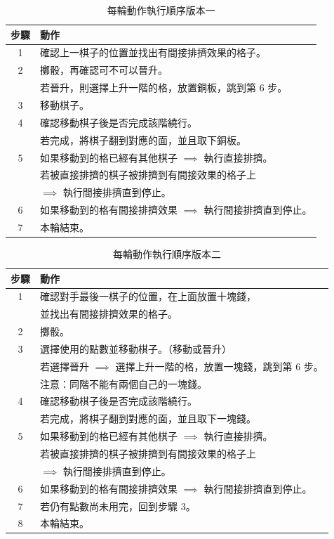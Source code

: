 \documentclass[11pt,a4paper]{article}
\begin{document}
\begin{table} 
	\caption{每輪動作執行順序版本一}
	\label{order_one}
	\centering
	\vspace{0.1cm}
	\begin{tabular}{cl}
		\toprule
			步驟 & 動作\\
		\hline
			1 & 確認上一棋子的位置並找出有間接排擠效果的格子。\\
			2 & 擲骰，再確認可不可以晉升。\\
			  & 若晉升，則選擇上升一階的格，放置銅板，跳到第 6 步。\\
			3 & 移動棋子。\\
			4 & 確認移動棋子後是否完成該階繞行。\\
			  & 若完成，將棋子翻到對應的面，並且取下銅板。\\
			5 & 如果移動到的格已經有其他棋子 $\implies$ 執行直接排擠。\\
			  & 若被直接排擠的棋子被排擠到有間接效果的格子上\\
			  & $\implies$ 執行間接排擠直到停止。\\
			6 & 如果移動到的格有間接排擠效果 $\implies$ 執行間接排擠直到停止。\\
			7 & 本輪結束。\\
		\bottomrule
	\end{tabular}
\end{table}

\begin{table} 
	\caption{每輪動作執行順序版本二}
	\label{order_two}
	\centering
	\vspace{0.1cm}
	\begin{tabular}{cl}
		\toprule
			步驟 & 動作\\
		\hline
			1 & 確認對手最後一棋子的位置，在上面放置十塊錢，\\
			  & 並找出有間接排擠效果的格子。\\
			2 & 擲骰。\\
			\hline
			3 & 選擇使用的點數並移動棋子。（移動或晉升）\\
			  & 若選擇晉升 $\implies$ 選擇上升一階的格，放置一塊錢，跳到第 6 步。\\
			  & \textsf{注意}：同階不能有兩個自己的一塊錢。\\
			4 & 確認移動棋子後是否完成該階繞行。\\
			  & 若完成，將棋子翻到對應的面，並且取下一塊錢。\\
			5 & 如果移動到的格已經有其他棋子 $\implies$ 執行直接排擠。\\
			  & 若被直接排擠的棋子被排擠到有間接效果的格子上\\
			  & $\implies$ 執行間接排擠直到停止。\\
			6 & 如果移動到的格有間接排擠效果 $\implies$ 執行間接排擠直到停止。\\
			7 & 若仍有點數尚未用完，回到步驟 3。\\
			8 & 本輪結束。\\
		\bottomrule
	\end{tabular}
\end{table}
\end{document}
